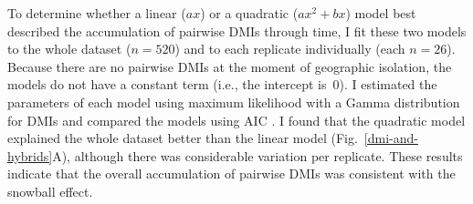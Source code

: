 \begin{doublespace}
To determine whether a linear ($ax$) or a quadratic ($ax^{2} + bx$) model
best described the accumulation of pairwise DMIs through time,
I fit these two models to the whole dataset ($n = 520$)
and to each replicate individually (each $n = 26$).
%
Because there are no pairwise DMIs at the moment of geographic isolation,
the models do not have a constant term (i.e., the intercept is~0).
%
I estimated the parameters of each model using maximum likelihood
with a Gamma distribution for DMIs and compared the models using AIC
\citep{bol08}.
%
I found that the quadratic model explained the whole dataset better
than the linear model (Fig.~\ref{dmi-and-hybrids}A),
although there was considerable variation per replicate.
%
These results indicate that the overall accumulation of pairwise DMIs
was consistent with the snowball effect.




\end{doublespace}
